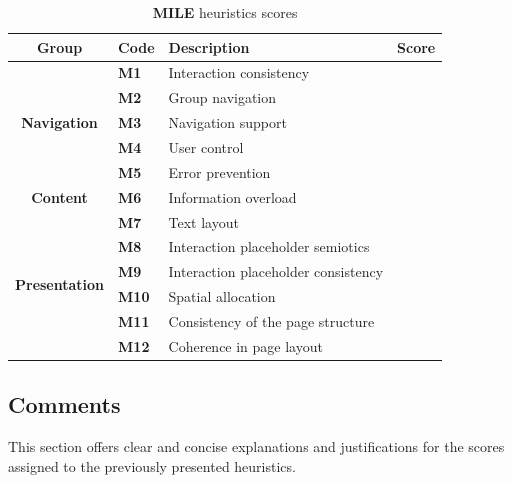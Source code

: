 \begin{table}[htp!]
    \centering
    \begin{tabular}{ |c|l|l|c| }
        \hline
        \textbf{Group} & \textbf{Code} & \textbf{Description} & \textbf{Score}\\
        \hline
        \multirow{5}{*}{\textbf{Navigation}} & \textbf{M1} & Interaction consistency & \textbf{\color{unicefRed}{2}}\\
        \cline{2-4}
        & \textbf{M2} & Group navigation & \textbf{\color{unicefGreen}{4}}\\
        \cline{2-4}
        & \textbf{M3} & Navigation support & \textbf{\color{unicefGreen}{4}}\\
        \cline{2-4}
        & \textbf{M4} & User control & \textbf{\color{unicefOrange}{3}}\\
        \cline{2-4}
        & \textbf{M5} & Error prevention & \textbf{\color{unicefGreen}{4}}\\
        \hline
        \textbf{Content} & \textbf{M6} & Information overload & \textbf{\color{unicefOrange}{3}}\\
        \hline
        \multirow{6}{*}{\textbf{Presentation}} & \textbf{M7} & Text layout & \textbf{\color{unicefGreen}{5}}\\
        \cline{2-4}
        & \textbf{M8} & Interaction placeholder semiotics & \textbf{\color{unicefGreen}{4}}\\
        \cline{2-4}
        & \textbf{M9} & Interaction placeholder consistency & \textbf{\color{unicefGreen}{4}}\\
        \cline{2-4}
        & \textbf{M10} & Spatial allocation & \textbf{\color{unicefOrange}{3}}\\
        \cline{2-4}
        & \textbf{M11} & Consistency of the page structure & \textbf{\color{unicefGreen}{4}}\\
        \cline{2-4}
        & \textbf{M12} & Coherence in page layout & \textbf{\color{unicefGreen}{5}}\\
        \hline
    \end{tabular}
    \caption{\textbf{MILE} heuristics scores}
\end{table}
\newpage
\subsection{Comments}
This section offers clear and concise explanations and justifications for the scores assigned to the previously presented heuristics.
